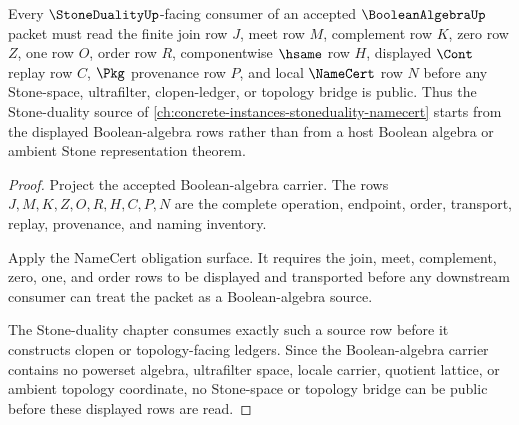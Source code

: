 \begin{theorem}
\label{thm:booleanalgebra-stone-duality-forward-route}
Every $\StoneDualityUp$-facing consumer of an accepted $\BooleanAlgebraUp$ packet must read the finite join row $J$, meet row $M$, complement row $K$, zero row $Z$, one row $O$, order row $R$, componentwise $\hsame$ row $H$, displayed $\Cont$ replay row $C$, $\Pkg$ provenance row $P$, and local $\NameCert$ row $N$ before any Stone-space, ultrafilter, clopen-ledger, or topology bridge is public. Thus the Stone-duality source of \autoref{ch:concrete-instances-stoneduality-namecert} starts from the displayed Boolean-algebra rows rather than from a host Boolean algebra or ambient Stone representation theorem.
\end{theorem}
\begin{proof}
Project the accepted Boolean-algebra carrier. The rows $J,M,K,Z,O,R,H,C,P,N$ are the complete operation, endpoint, order, transport, replay, provenance, and naming inventory.

Apply the NameCert obligation surface. It requires the join, meet, complement, zero, one, and order rows to be displayed and transported before any downstream consumer can treat the packet as a Boolean-algebra source.

The Stone-duality chapter consumes exactly such a source row before it constructs clopen or topology-facing ledgers. Since the Boolean-algebra carrier contains no powerset algebra, ultrafilter space, locale carrier, quotient lattice, or ambient topology coordinate, no Stone-space or topology bridge can be public before these displayed rows are read.
\end{proof}

